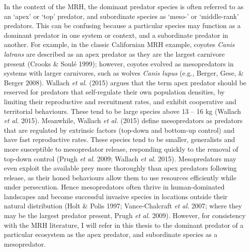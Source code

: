\documentclass[11pt,a4paper,titlepage,twoside,openright]{style/unimelbthesis}
\begin{document}
\begin{mainmatter}
In the context of the MRH, the dominant predator species is often referred to as an `apex' or `top' predator, and subordinate species as `meso-' or `middle-rank' predators. This can be confusing because a particular species may function as a dominant predator in one system or context, and a subordinate predator in another. For example, in the classic Californian MRH example, coyotes \emph{Canis latrans} are described as an apex predator as they are the largest carnivore present (Crooks \& Soulé 1999); however, coyotes evolved as mesopredators in systems with larger carnivores, such as wolves \emph{Canis lupus} (e.g., Berger, Gese, \& Berger 2008). Wallach \emph{et al.} (2015) argues that the term apex predator should be reserved for predators that self-regulate their own population densities, by limiting their reproductive and recruitment rates, and exhibit cooperative and territorial behaviours. These tend to be large species above 13 -- 16 kg (Wallach \emph{et al.} 2015). Meanwhile, Wallach \emph{et al.} (2015) define mesopredators as predators that are regulated by extrinsic factors (top-down and bottom-up control) and have fast reproductive rates. These species tend to be smaller, generalists and more susceptible to mesopredator release, responding quickly to the removal of top-down control (Prugh \emph{et al.} 2009; Wallach \emph{et al.} 2015). Mesopredators may even exploit the available prey more thoroughly than apex predators following release, as their honed behaviours allow them to use resources efficiently while under persecution. Hence mesopredators often thrive in human-dominated landscapes and become successful invasive species in locations outside their natural distribution (Holt \& Polis 1997; Vance-Chalcraft \emph{et al.} 2007; where they may be the largest predator present, Prugh \emph{et al.} 2009). However, for consistency with the MRH literature, I will refer in this thesis to the dominant predator of a particular ecosystem as the apex predator, and subordinate species as a mesopredator.


\end{mainmatter}
\end{document}
